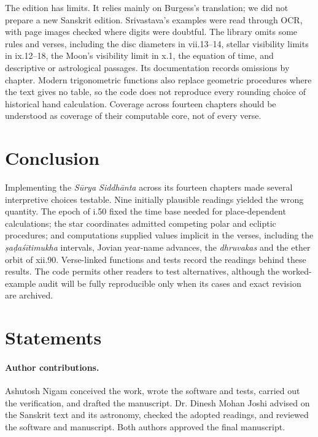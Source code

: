 \documentclass[11pt,a4paper]{article}
\begin{document}
The edition has limits. It relies mainly on Burgess's translation; we did not prepare a new Sanskrit edition. Srivastava's examples were read through OCR, with page images checked where digits were doubtful. The library omits some rules and verses, including the disc diameters in vii.13--14, stellar visibility limits in ix.12--18, the Moon's visibility limit in x.1, the equation of time, and descriptive or astrological passages. Its documentation records omissions by chapter. Modern trigonometric functions also replace geometric procedures where the text gives no table, so the code does not reproduce every rounding choice of historical hand calculation. Coverage across fourteen chapters should be understood as coverage of their computable core, not of every verse.

\section{Conclusion}
\label{sec:conclusion}

Implementing the \textit{S\={u}rya Siddh\={a}nta} across its fourteen chapters made several interpretive choices testable. Nine initially plausible readings yielded the wrong quantity. The epoch of i.50 fixed the time base needed for place-dependent calculations; the star coordinates admitted competing polar and ecliptic procedures; and computations supplied values implicit in the verses, including the \textit{\d{s}a\d{d}a\'{s}\={i}timukha} intervals, Jovian year-name advances, the \textit{dhruvakas} and the ether orbit of xii.90. Verse-linked functions and tests record the readings behind these results. The code permits other readers to test alternatives, although the worked-example audit will be fully reproducible only when its cases and exact revision are archived.

\section*{Statements}

\paragraph{Author contributions.} Ashutosh Nigam conceived the work, wrote the software and tests, carried out the verification, and drafted the manuscript. Dr. Dinesh Mohan Joshi advised on the Sanskrit text and its astronomy, checked the adopted readings, and reviewed the software and manuscript. Both authors approved the final manuscript.
\end{document}
